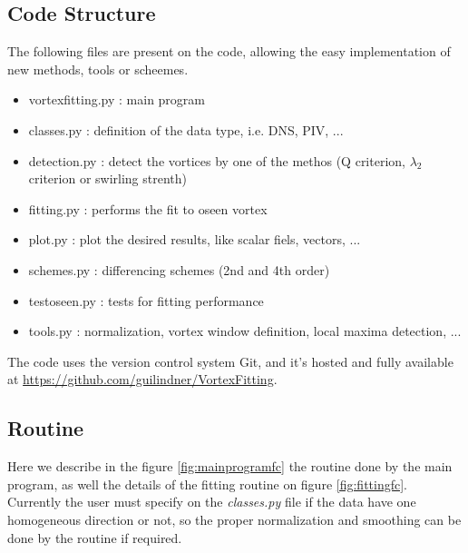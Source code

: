 \documentclass[12pt, a4paper, openany]{memoir}
\begin{document}
\newpage
\subsection{Code Structure}

The following files are present on the code, allowing the easy implementation of new methods, tools or scheemes.

\begin{itemize}
	\item vortexfitting.py : main program
	\item classes.py : definition of the data type, i.e. DNS, PIV, ...
	\item detection.py : detect the vortices by one of the methos (Q criterion, $\lambda_2$ criterion or swirling strenth)
	\item fitting.py : performs the fit to oseen vortex
	\item plot.py : plot the desired results, like scalar fiels, vectors, ...
	\item schemes.py : differencing schemes (2nd and 4th order)
	\item testoseen.py : tests for fitting performance
	\item tools.py : normalization, vortex window definition, local maxima detection, ... 
\end{itemize}

The code uses the version control system Git, and it's hosted and fully available at \url{https://github.com/guilindner/VortexFitting}. 

\newpage
\subsection{Routine}

Here we describe in the figure \ref{fig:mainprogramfc} the routine done by the main program, as well the details of the fitting routine on figure \ref{fig:fittingfc}. Currently the user must specify on the \textit{classes.py} file if the data have one homogeneous direction or not, so the proper normalization and smoothing can be done by the routine if required.
\end{document}
